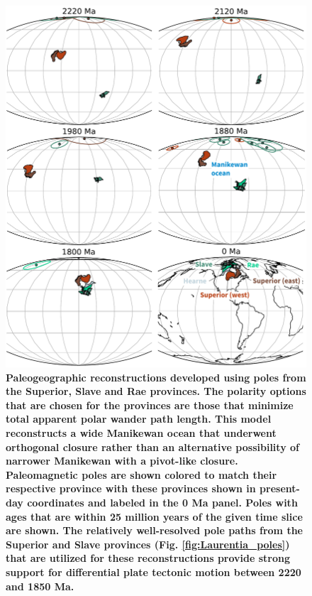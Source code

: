 \documentclass[11pt,letterpaper]{article}
\begin{document}
\begin{figure}
\centering
\includegraphics[width=\textwidth]{../Figures/Superior_Slave_reconstructions.pdf}
\caption{\small{\textbf{Paleogeographic reconstructions developed using poles from the Superior, Slave and Rae provinces. The polarity options that are chosen for the provinces are those that minimize total apparent polar wander path length. This model reconstructs a wide Manikewan ocean that underwent orthogonal closure rather than an alternative possibility of narrower Manikewan with a pivot-like closure. Paleomagnetic poles are shown colored to match their respective province with these provinces shown in present-day coordinates and labeled in the 0 Ma panel. Poles with ages that are within 25 million years of the given time slice are shown. The relatively well-resolved pole paths from the Superior and Slave provinces (Fig. \ref{fig:Laurentia_poles}) that are utilized for these reconstructions provide strong support for differential plate tectonic motion between 2220 and 1850 Ma.}}}
\label{fig:Superior_Slave_recons}
\end{figure}
\end{document}
